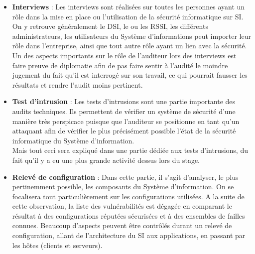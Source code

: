 \documentclass[a4paper]{memoir}
\begin{document}
\begin{itemize}

\item \textbf{Interviews} : Les interviews sont réalisées sur toutes les personnes ayant un rôle dans la mise en place ou l'utilisation de la sécurité informatique sur SI.
On y retrouve généralement le DSI, le ou les RSSI, les différents administrateurs, les utilisateurs du Système d'informations peut importer leur rôle dans l'entreprise, ainsi que tout autre rôle ayant un lien avec la sécurité.\\
Un des aspects importants sur le rôle de l'auditeur lors des interviews est faire preuve de diplomatie afin de pas faire sentir à l'audité le moindre jugement du fait qu'il est interrogé sur son travail, ce qui pourrait fausser les résultats et rendre l'audit moins pertinent.\\

\item \textbf{Test d'intrusion} : Les tests d'intrusions sont une partie importante des audits techniques. Ils permettent de vérifier un système de sécurité d'une manière très perspicace puisque que l'auditeur se positionne en tant qu'un attaquant afin de vérifier le plus précisément possible l'état de la sécurité informatique du Système d'information.\\
Mais tout ceci sera expliqué dans une partie dédiée aux tests d'intrusions, du fait qu'il y a eu une plus grande activité dessus lors du stage.\\

\item \textbf{Relevé de configuration} : Dans cette partie, il s'agit d'analyser, le plus pertinemment possible, les composants du Système d'information. On se focalisera tout particulièrement sur les configurations utilisées. A la suite de cette observation, la liste des vulnérabilités est dégagée en comparant le résultat à des configurations réputées sécurisées et à des ensembles de failles connues. Beaucoup d'aspects peuvent être contrôlés durant un relevé de configuration, allant de l'architecture du SI aux applications, en passant par les hôtes (clients et serveurs).\\


\end{itemize}
\end{document}
